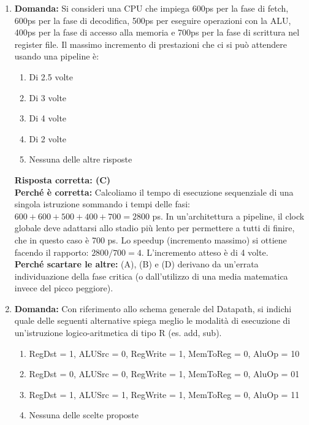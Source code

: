 \documentclass[12pt, a4paper]{article}
\begin{document}
\begin{enumerate}
    \item \textbf{Domanda:} Si consideri una CPU che impiega 600ps per la fase di fetch, 600ps per la fase di decodifica, 500ps per eseguire operazioni con la ALU, 400ps per la fase di accesso alla memoria e 700ps per la fase di scrittura nel register file. Il massimo incremento di prestazioni che ci si può attendere usando una pipeline è:
    \begin{enumerate}[label=(\Alph*)]
        \item Di 2.5 volte
        \item Di 3 volte
        \item Di 4 volte
        \item Di 2 volte
        \item Nessuna delle altre risposte
    \end{enumerate}
    \textbf{Risposta corretta: (C)} \\
    \textbf{Perché è corretta:} Calcoliamo il tempo di esecuzione sequenziale di una singola istruzione sommando i tempi delle fasi: $600 + 600 + 500 + 400 + 700 = 2800$ ps. In un'architettura a pipeline, il clock globale deve adattarsi allo stadio più lento per permettere a tutti di finire, che in questo caso è 700 ps. Lo speedup (incremento massimo) si ottiene facendo il rapporto: $2800 / 700 = 4$. L'incremento atteso è di 4 volte. \\
    \textbf{Perché scartare le altre:} (A), (B) e (D) derivano da un'errata individuazione della fase critica (o dall'utilizzo di una media matematica invece del picco peggiore).

    \item \textbf{Domanda:} Con riferimento allo schema generale del Datapath, si indichi quale delle seguenti alternative spiega meglio le modalità di esecuzione di un'istruzione logico-aritmetica di tipo R (es. add, sub).
    \begin{enumerate}[label=(\Alph*)]
        \item RegDst = 1, ALUSrc = 0, RegWrite = 1, MemToReg = 0, AluOp = 10
        \item RegDst = 0, ALUSrc = 0, RegWrite = 1, MemToReg = 0, AluOp = 01
        \item RegDst = 1, ALUSrc = 1, RegWrite = 1, MemToReg = 0, AluOp = 11
        \item Nessuna delle scelte proposte
    \end{enumerate}


\end{enumerate}
\end{document}
